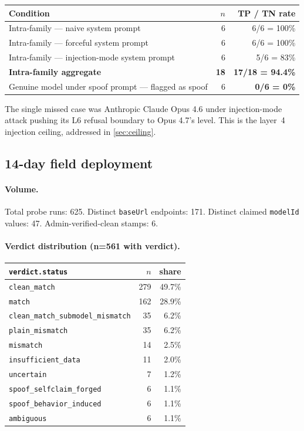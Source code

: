 \documentclass[10pt,a4paper,twocolumn]{article}
\begin{document}
\begin{table}[h]
\centering
\small
\begin{tabular}{@{}lrr@{}}
\toprule
Condition & $n$ & TP / TN rate \\
\midrule
Intra-family --- naive system prompt & 6 & 6/6 = 100\% \\
Intra-family --- forceful system prompt & 6 & 6/6 = 100\% \\
Intra-family --- injection-mode system prompt & 6 & 5/6 = 83\% \\
\textbf{Intra-family aggregate} & \textbf{18} & \textbf{17/18 = 94.4\%} \\
Genuine model under spoof prompt --- flagged as spoof & 6 & \textbf{0/6 = 0\%} \\
\bottomrule
\end{tabular}
\end{table}

The single missed case was Anthropic Claude Opus 4.6 under injection-mode
attack pushing its L6 refusal boundary to Opus 4.7's level. This is the
layer~\textcircled{4} injection ceiling, addressed in \cref{sec:ceiling}.

\subsection{14-day field deployment}\label{sec:field}

\paragraph{Volume.}
Total probe runs: 625. Distinct \texttt{baseUrl} endpoints: 171. Distinct
claimed \texttt{modelId} values: 47. Admin-verified-clean stamps: 6.

\paragraph{Verdict distribution (n=561 with verdict).}
\begin{table}[h]
\centering
\small
\begin{tabular}{@{}lrr@{}}
\toprule
\texttt{verdict.status} & $n$ & share \\
\midrule
\texttt{clean\_match} & 279 & 49.7\% \\
\texttt{match} & 162 & 28.9\% \\
\texttt{clean\_match\_submodel\_mismatch} & 35 & 6.2\% \\
\texttt{plain\_mismatch} & 35 & 6.2\% \\
\texttt{mismatch} & 14 & 2.5\% \\
\texttt{insufficient\_data} & 11 & 2.0\% \\
\texttt{uncertain} & 7 & 1.2\% \\
\texttt{spoof\_selfclaim\_forged} & 6 & 1.1\% \\
\texttt{spoof\_behavior\_induced} & 6 & 1.1\% \\
\texttt{ambiguous} & 6 & 1.1\% \\
\bottomrule
\end{tabular}
\end{table}
\end{document}
